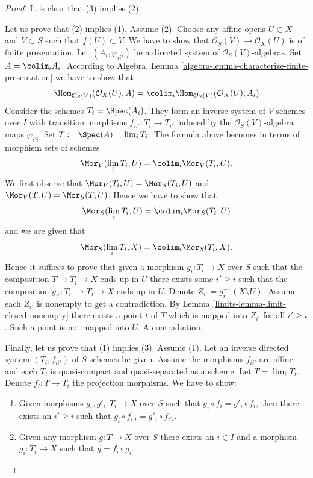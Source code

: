 \begin{proof}

It is clear that (3) implies (2).

\medskip\noindent
Let us prove that (2) implies (1). Assume (2).
Choose any affine opens $U \subset X$ and $V \subset S$ such that
$f(U) \subset V$. We have to show that
$\mathcal{O}_S(V) \to \mathcal{O}_X(U)$ is of finite presentation.
Let $(A_i, \varphi_{ii'})$ be a directed system of
$\mathcal{O}_S(V)$-algebras. Set $A = \colim_i A_i$.
According to
Algebra, Lemma \ref{algebra-lemma-characterize-finite-presentation}
we have to show that
$$
\Hom_{\mathcal{O}_S(V)}(\mathcal{O}_X(U), A) =
\colim_i \Hom_{\mathcal{O}_S(V)}(\mathcal{O}_X(U), A_i)
$$
Consider the schemes $T_i = \Spec(A_i)$. They
form an inverse system of $V$-schemes over $I$
with transition morphisms $f_{ii'} : T_i \to T_{i'}$
induced by the $\mathcal{O}_S(V)$-algebra maps $\varphi_{i'i}$.
Set $T := \Spec(A) = \lim_i T_i$.
The formula above becomes in terms of morphism sets of schemes
$$
\Mor_V(\lim_i T_i, U) =
\colim_i \Mor_V(T_i, U).
$$
We first observe that
$\Mor_V(T_i, U) = \Mor_S(T_i, U)$
and
$\Mor_V(T, U) = \Mor_S(T, U)$.
Hence we have to show that
$$
\Mor_S(\lim_i T_i, U) =
\colim_i \Mor_S(T_i, U)
$$
and we are given that
$$
\Mor_S(\lim_i T_i, X) =
\colim_i \Mor_S(T_i, X).
$$
Hence it suffices to prove that given a morphism $g_i : T_i \to X$ over $S$
such that the composition $T \to T_i \to X$ ends up in $U$ there exists some
$i' \geq i$ such that the composition $g_{i'} : T_{i'} \to T_i \to X$ ends up
in $U$. Denote $Z_{i'} = g_{i'}^{-1}(X \setminus U)$.
Assume each $Z_{i'}$ is nonempty
to get a contradiction. By Lemma \ref{limits-lemma-limit-closed-nonempty}
there exists a point $t$ of $T$ which is mapped into $Z_{i'}$ for all
$i' \geq i$. Such a point is not mapped into $U$. A contradiction.

\medskip\noindent
Finally, let us prove that (1) implies (3). Assume (1). Let an inverse directed
system $(T_i, f_{ii'})$ of $S$-schemes be given. Assume the morphisms $f_{ii'}$
are affine and each $T_i$ is quasi-compact and quasi-separated as a scheme. Let
$T = \lim_i T_i$. Denote $f_i : T \to T_i$ the projection morphisms.
We have to show:
\begin{enumerate}
\item[(a)] Given morphisms $g_i, g'_i : T_i \to X$ over $S$ such that
$g_i \circ f_i = g'_i \circ f_i$, then there exists an $i' \geq i$
such that $g_i \circ f_{i'i} = g'_i \circ f_{i'i}$.
\item[(b)] Given any morphism
$g : T \to X$ over $S$ there exists an $i \in I$ and a morphism
$g_i : T_i \to X$ such that $g = f_i \circ g_i$.
\end{enumerate}


\end{proof}
